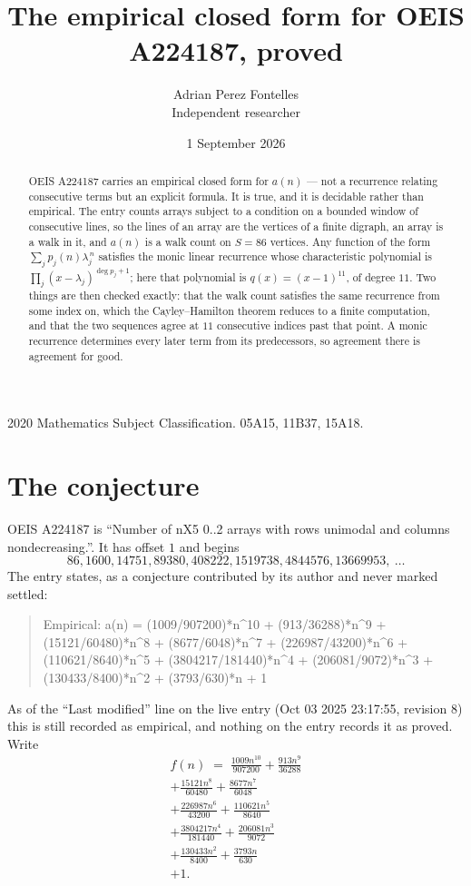 \documentclass[11pt,a4paper]{article}
\title{The empirical closed form for OEIS A224187, proved}
\author{Adrian Perez Fontelles\\ \small Independent researcher}
\date{1 September 2026}
\theoremstyle{plain}
\theoremstyle{definition}
\begin{document}
\maketitle

\begin{abstract}
OEIS A224187 carries an empirical closed form for $a(n)$ --- not a recurrence relating
consecutive terms but an explicit formula. It is true, and it is decidable rather than
empirical. The entry counts arrays subject to a condition on a bounded window of consecutive lines, so the lines of an array are the
vertices of a finite digraph, an array is a walk in it, and $a(n)$ is a walk count on
$S=86$ vertices. Any function of the form $\sum_j p_j(n)\lambda_j^{\,n}$ satisfies the
monic linear recurrence whose characteristic polynomial is
$\prod_j(x-\lambda_j)^{\deg p_j+1}$; here that polynomial is $q(x)=(x-1)^{11}$, of degree
$11$. Two things are then checked exactly: that the walk count satisfies the same
recurrence from some index on, which the Cayley--Hamilton theorem reduces to a finite
computation, and that the two sequences agree at $11$ consecutive indices past that
point. A monic recurrence determines every later term from its predecessors, so agreement
there is agreement for good.
\end{abstract}

\noindent\small 2020 Mathematics Subject Classification. 05A15, 11B37, 15A18.\normalsize

\section{The conjecture}

OEIS A224187 is ``Number of nX5 0..2 arrays with rows unimodal and columns nondecreasing.''. It has offset $1$ and begins
\[
86, 1600, 14751, 89380, 408222, 1519738, 4844576, 13669953,\ \dots
\]
The entry states, as a conjecture contributed by its author and never marked settled:
\begin{quote}
Empirical: a(n) = (1009/907200)*n\^{}10 + (913/36288)*n\^{}9 + (15121/60480)*n\^{}8 + (8677/6048)*n\^{}7 + (226987/43200)*n\^{}6 + (110621/8640)*n\^{}5 + (3804217/181440)*n\^{}4 + (206081/9072)*n\^{}3 + (130433/8400)*n\^{}2 + (3793/630)*n + 1
\end{quote}
As of the ``Last modified'' line on the live entry (Oct 03 2025 23:17:55, revision 8) this is still
recorded as empirical, and nothing on the entry records it as proved. Write
\begin{multline*}
f(n)\;=\;\frac{1009 n^{10}}{907200} + \frac{913 n^{9}}{36288} \\
+ \frac{15121 n^{8}}{60480} + \frac{8677 n^{7}}{6048} \\
+ \frac{226987 n^{6}}{43200} + \frac{110621 n^{5}}{8640} \\
+ \frac{3804217 n^{4}}{181440} + \frac{206081 n^{3}}{9072} \\
+ \frac{130433 n^{2}}{8400} + \frac{3793 n}{630} \\
+ 1.
\end{multline*}
\end{document}
